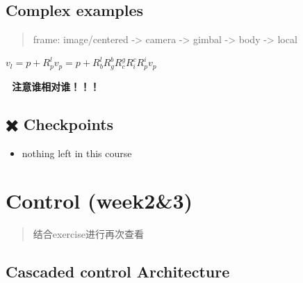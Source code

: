 \documentclass[]{article}
\begin{document}
\subsection{Complex examples}\label{header-n517}

\begin{quote}
frame: image/centered -\textgreater{} camera -\textgreater{} gimbal
-\textgreater{} body -\textgreater{} local
\end{quote}

\(v_{l}=p+R_{p}^{l} v_{p}=p+R_{b}^{l} R_{g}^{b} R_{c}^{g} R_{i}^{c} R_{p}^{i} v_{p}\)

\textbf{🚧 注意谁相对谁！！！}

\subsection{✖️ Checkpoints}\label{header-n522}

\begin{itemize}
\item
  nothing left in this course
\end{itemize}

\section{Control (week2\&3)}\label{header-n526}

\begin{quote}
结合exercise进行再次查看
\end{quote}

\subsection{Cascaded control Architecture}\label{header-n529}
\end{document}
